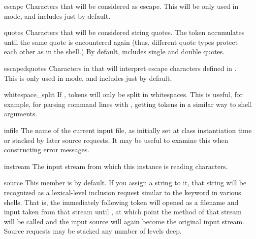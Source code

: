 \begin{memberdesc}{escape}
Characters that will be considered as escape. This will be only used
in \POSIX{} mode, and includes just \character{\textbackslash} by default.
\end{memberdesc}

\begin{memberdesc}{quotes}
Characters that will be considered string quotes.  The token
accumulates until the same quote is encountered again (thus, different
quote types protect each other as in the shell.)  By default, includes
\ASCII{} single and double quotes.
\end{memberdesc}

\begin{memberdesc}{escapedquotes}
Characters in  that will interpret escape characters
defined in .  This is only used in \POSIX{} mode, and
includes just  by default.
\end{memberdesc}

\begin{memberdesc}{whitespace_split}
If , tokens will only be split in whitespaces. This is useful, for
example, for parsing command lines with , getting tokens
in a similar way to shell arguments.
\end{memberdesc}

\begin{memberdesc}{infile}
The name of the current input file, as initially set at class
instantiation time or stacked by later source requests.  It may
be useful to examine this when constructing error messages.
\end{memberdesc}

\begin{memberdesc}{instream}
The input stream from which this  instance is reading
characters.
\end{memberdesc}

\begin{memberdesc}{source}
This member is  by default.  If you assign a string to it,
that string will be recognized as a lexical-level inclusion request
similar to the  keyword in various shells.  That is, the
immediately following token will opened as a filename and input taken
from that stream until \EOF, at which point the 
method of that stream will be called and the input source will again
become the original input stream. Source requests may be stacked any
number of levels deep.
\end{memberdesc}

